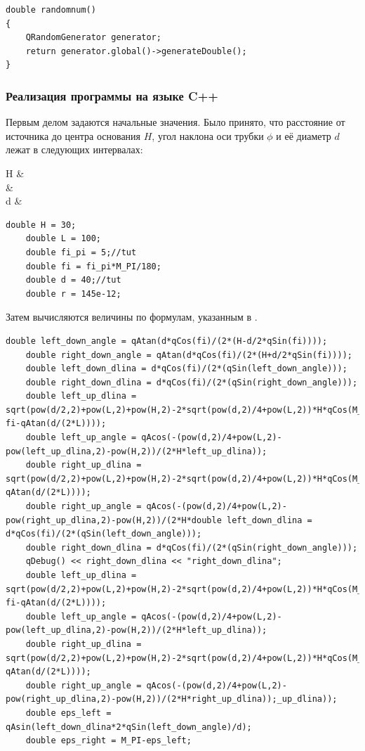 \documentclass[../AISTR.tex]{subfiles}
\begin{document}
\begin{lstlisting}[caption=Генерация случайных чисел,captionpos=b, label={list:randomnum}]
double randomnum()
{
	QRandomGenerator generator;
	return generator.global()->generateDouble();
}
\end{lstlisting}
\subsubsection{Реализация программы на языке C++}	
Первым делом задаются начальные значения. Было принято, что расстояние от источника до центра основания $H$, угол наклона оси трубки $\phi$ и её диаметр $d$ лежат в следующих интервалах:
\begin{aleq}
	H &\in \left[10, 50\right]\\
	\phi &\in \left[0, 10\right]\grad\\
	d &\in \left[10, 50\right]
\end{aleq}


\begin{lstlisting}[caption=Исходные значения,captionpos=b, label={list:initval}]
	double H = 30;
	double L = 100;
	double fi_pi = 5;//tut
	double fi = fi_pi*M_PI/180;
	double d = 40;//tut
	double r = 145e-12;
\end{lstlisting}

Затем вычисляются величины по формулам, указанным в .

\begin{lstlisting}[caption=Вычисление граничных условий,captionpos=b, label={list:calculate}]
	double left_down_angle = qAtan(d*qCos(fi)/(2*(H-d/2*qSin(fi))));
	double right_down_angle = qAtan(d*qCos(fi)/(2*(H+d/2*qSin(fi))));
	double left_down_dlina = d*qCos(fi)/(2*(qSin(left_down_angle)));
	double right_down_dlina = d*qCos(fi)/(2*(qSin(right_down_angle)));
	double left_up_dlina = sqrt(pow(d/2,2)+pow(L,2)+pow(H,2)-2*sqrt(pow(d,2)/4+pow(L,2))*H*qCos(M_PI-fi-qAtan(d/(2*L))));
	double left_up_angle = qAcos(-(pow(d,2)/4+pow(L,2)-pow(left_up_dlina,2)-pow(H,2))/(2*H*left_up_dlina));
	double right_up_dlina = sqrt(pow(d/2,2)+pow(L,2)+pow(H,2)-2*sqrt(pow(d,2)/4+pow(L,2))*H*qCos(M_PI+fi-qAtan(d/(2*L))));
	double right_up_angle = qAcos(-(pow(d,2)/4+pow(L,2)-pow(right_up_dlina,2)-pow(H,2))/(2*H*double left_down_dlina = d*qCos(fi)/(2*(qSin(left_down_angle)));
	double right_down_dlina = d*qCos(fi)/(2*(qSin(right_down_angle)));
	qDebug() << right_down_dlina << "right_down_dlina";
	double left_up_dlina = sqrt(pow(d/2,2)+pow(L,2)+pow(H,2)-2*sqrt(pow(d,2)/4+pow(L,2))*H*qCos(M_PI-fi-qAtan(d/(2*L))));
	double left_up_angle = qAcos(-(pow(d,2)/4+pow(L,2)-pow(left_up_dlina,2)-pow(H,2))/(2*H*left_up_dlina));
	double right_up_dlina = sqrt(pow(d/2,2)+pow(L,2)+pow(H,2)-2*sqrt(pow(d,2)/4+pow(L,2))*H*qCos(M_PI+fi-qAtan(d/(2*L))));
	double right_up_angle = qAcos(-(pow(d,2)/4+pow(L,2)-pow(right_up_dlina,2)-pow(H,2))/(2*H*right_up_dlina));_up_dlina));
	double eps_left = qAsin(left_down_dlina*2*qSin(left_down_angle)/d);
	double eps_right = M_PI-eps_left;
\end{lstlisting}
\end{document}
